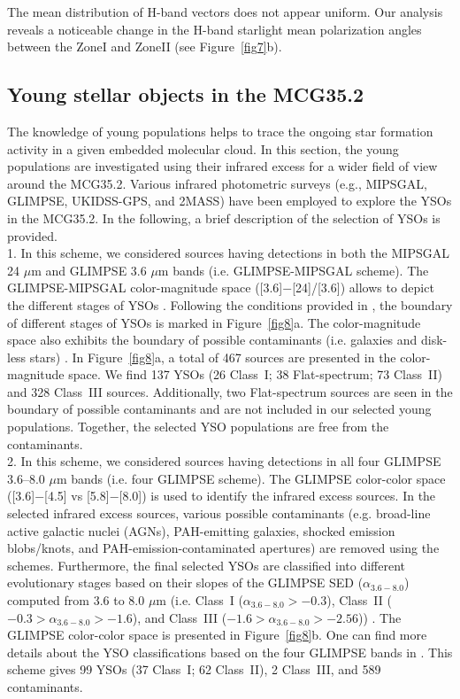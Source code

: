 \documentclass[iop]{emulateapj}
\begin{document}
The mean distribution of H-band vectors does not appear uniform. 
Our analysis reveals a noticeable change in the H-band starlight mean polarization angles between the ZoneI and ZoneII (see Figure~\ref{fig7}b).  
%
\subsection{Young stellar objects in the MCG35.2}
\label{subsec:phot1}
%
The knowledge of young populations helps to trace the ongoing star formation activity in a given embedded molecular cloud.
In this section, the young populations are investigated using their infrared excess for a wider field of view around the MCG35.2.
Various infrared photometric surveys (e.g., MIPSGAL, GLIMPSE, UKIDSS-GPS, and 2MASS) have been employed to 
explore the YSOs in the MCG35.2. 
In the following, a brief description of the selection of YSOs is provided.\\

1. In this scheme, we considered sources having detections in both the MIPSGAL 24 $\mu$m and GLIMPSE 3.6 $\mu$m bands (i.e. GLIMPSE-MIPSGAL scheme).
The GLIMPSE-MIPSGAL color-magnitude space ([3.6]$-$[24]/[3.6]) allows to depict the different stages of YSOs \citep{guieu10,rebull11,dewangan15}.
Following the conditions provided in \citet{guieu10}, the boundary of different stages of YSOs is marked in Figure~\ref{fig8}a. 
The color-magnitude space also exhibits the boundary of possible contaminants (i.e. galaxies and disk-less stars) \citep[see Figure~10 in][]{rebull11}.
In Figure~\ref{fig8}a, a total of 467 sources are presented in the color-magnitude space.
We find 137 YSOs (26 Class~I; 38 Flat-spectrum; 73 Class~II) and 328 Class~III sources. 
Additionally, two Flat-spectrum sources are seen in the boundary of possible contaminants and are not included in our selected young populations. 
Together, the selected YSO populations are free from the contaminants. \\
 
2. In this scheme, we considered sources having detections in all four GLIMPSE 3.6--8.0 $\mu$m bands (i.e. four GLIMPSE scheme). 
The GLIMPSE color-color space ([3.6]$-$[4.5] vs [5.8]$-$[8.0]) is used to identify the infrared excess sources. 
In the selected infrared excess sources, various possible contaminants (e.g. broad-line active galactic nuclei (AGNs), 
PAH-emitting galaxies, shocked emission blobs/knots, and PAH-emission-contaminated apertures) are removed using the \citet{gutermuth09} schemes.
Furthermore, the final selected YSOs are classified into different evolutionary stages based on their 
slopes of the GLIMPSE SED ($\alpha_{3.6-8.0}$) computed from 3.6 to 8.0 $\mu$m 
(i.e. Class~I ($\alpha_{3.6-8.0} > -0.3$), Class~II ($-0.3 > \alpha_{3.6-8.0} > -1.6$), 
and Class~III ($-1.6> \alpha_{3.6-8.0} > -2.56$)) \citep[e.g.,][]{lada06}. 
The GLIMPSE color-color space is presented in Figure~\ref{fig8}b. 
One can find more details about the YSO classifications based on the four GLIMPSE bands in \citet{dewangan11}. 
This scheme gives 99 YSOs (37 Class~I; 62 Class~II), 2 Class~III, and 589 contaminants.\\ 
\end{document}
